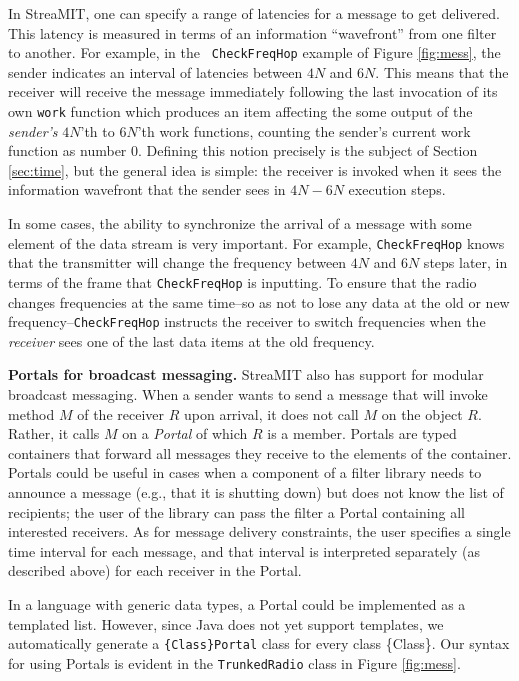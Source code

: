 In StreaMIT, one can specify a range of latencies for a message to get
delivered.  This latency is measured in terms of an information
``wavefront'' from one filter to another.  For example, in the {\tt
CheckFreqHop} example of Figure \ref{fig:mess}, the sender indicates
an interval of latencies between $4N$ and $6N$.  This means that the
receiver will receive the message immediately following the last
invocation of its own {\tt work} function which produces an item
affecting the some output of the {\it sender's} $4N$'th to $6N$'th
work functions, counting the sender's current work function as number
0.  Defining this notion precisely is the subject of Section
\ref{sec:time}, but the general idea is simple:  the receiver is
invoked when it sees the information wavefront that the sender sees in
$4N-6N$ execution steps.

In some cases, the ability to synchronize the arrival of a message
with some element of the data stream is very important.  For example,
{\tt CheckFreqHop} knows that the transmitter will change the
frequency between $4N$ and $6N$ steps later, in terms of the frame
that {\tt CheckFreqHop} is inputting.  To ensure that the radio
changes frequencies at the same time--so as not to lose any data at
the old or new frequency--{\tt CheckFreqHop} instructs the receiver to
switch frequencies when the {\it receiver} sees one of the last data
items at the old frequency.

{\bf Portals for broadcast messaging.}  StreaMIT also has support for
modular broadcast messaging.  When a sender wants to send a message
that will invoke method $M$ of the receiver $R$ upon arrival, it does
not call $M$ on the object $R$.  Rather, it calls $M$ on a {\it
Portal} of which $R$ is a member.  Portals are typed containers that
forward all messages they receive to the elements of the container.
Portals could be useful in cases when a component of a filter library
needs to announce a message (e.g., that it is shutting down) but does
not know the list of recipients; the user of the library can pass the
filter a Portal containing all interested receivers.  As for message
delivery constraints, the user specifies a single time interval for
each message, and that interval is interpreted separately (as
described above) for each receiver in the Portal.

In a language with generic data types, a Portal could be implemented
as a templated list.  However, since Java does not yet support
templates, we automatically generate a {\tt \{Class\}Portal} class for
every class \{Class\}.  Our syntax for using Portals is evident in the
{\tt TrunkedRadio} class in Figure \ref{fig:mess}.


